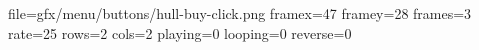 file=gfx/menu/buttons/hull-buy-click.png
framex=47
framey=28
frames=3
rate=25
rows=2
cols=2
playing=0
looping=0
reverse=0